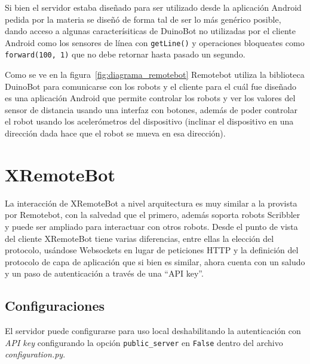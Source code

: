 Si bien el servidor estaba diseñado para ser utilizado desde la
aplicación Android pedida por la materia
se diseñó de forma tal de ser lo más genérico posible, dando acceso
a algunas caracterísiticas de DuinoBot no utilizadas por el cliente
Android como los sensores de línea con \texttt{getLine()} y operaciones
bloqueates como \texttt{forward(100, 1)} que no debe retornar
hasta pasado un segundo.

Como se ve en la figura~\ref{fig:diagrama_remotebot} Remotebot utiliza la
biblioteca DuinoBot para comunicarse con los robots y el cliente para el cuál
fue diseñado es una aplicación Android que permite controlar los robots
y ver los valores del sensor de distancia usando una interfaz con botones,
además de poder controlar el robot usando los acelerómetros del dispositivo
(inclinar el dispositivo en una dirección dada hace que el robot se mueva
en esa dirección).

\section{XRemoteBot}\label{sec:xremotebot}

La interacción de XRemoteBot a nivel arquitectura es muy similar a la provista por Remotebot,
con la salvedad que el primero, además soporta robots Scribbler y puede ser
ampliado para interactuar con otros robots. Desde el punto de vista del cliente
XRemoteBot tiene varias diferencias, entre ellas la elección del protocolo,
usándose Websockets en lugar de peticiones HTTP y la definición del protocolo
de capa de aplicación que si bien es similar, ahora cuenta con un saludo y
un paso de autenticación a través de una ``API key''.



\subsection{Configuraciones}

El servidor puede configurarse para uso local deshabilitando la
autenticación con \textit{API key} configurando la opción
\texttt{public\_server} en \texttt{False} dentro del archivo
\textit{configuration.py}.

